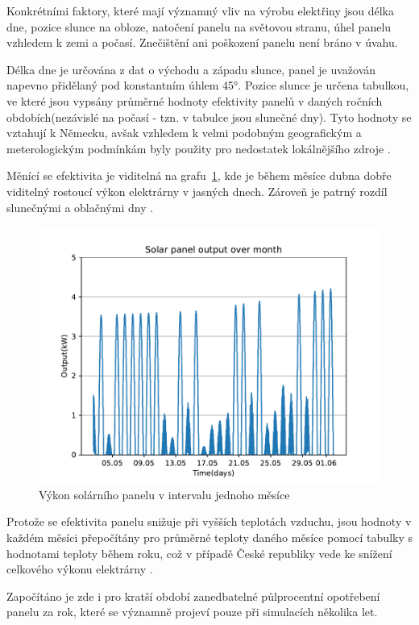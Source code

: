 \documentclass[12pt,a4paper]{Cotmas-2018}
\begin{document}
Konkrétními faktory, které mají významný vliv na výrobu elektřiny jsou délka dne, pozice slunce na obloze, natočení panelu na světovou stranu, úhel panelu vzhledem k zemi a počasí. Znečištění ani poškození panelu není bráno v úvahu.

Délka dne je určována z dat o východu a západu slunce, panel je uvažován napevno přidělaný pod konstantním úhlem 45°.
Pozice slunce je určena tabulkou, ve které jsou vypsány průměrné hodnoty efektivity panelů v daných ročních obdobích(nezávislé na počasí - tzn. v tabulce jsou slunečné dny). Tyto hodnoty se vztahují k Německu, avšak vzhledem k velmi podobným geografickým a meterologickým podmínkám byly použity pro nedostatek lokálnějšího zdroje 
\cite{German-solar-hourly-2014}.

 Měnící se efektivita je viditelná na grafu~\ref{fig:solar_month}, kde je během měsíce dubna dobře viditelný rostoucí výkon elektrárny v jasných dnech. Zároveň je patrný rozdíl slunečnými a oblačnými dny \cite{PF-Bach-2022}.

\begin{figure}[H]
\begin{center}
\includegraphics[width=0.8\linewidth]{img/solar_month.pdf}
\caption{Výkon solárního panelu v intervalu jednoho měsíce}
\end{center}
\label{fig:solar_month}
\end{figure}

Protože se efektivita panelu snižuje při vyšších teplotách vzduchu, jsou hodnoty v každém měsíci přepočítány pro průměrné teploty daného měsíce pomocí tabulky s hodnotami teploty během roku, což v případě České republiky vede ke snížení celkového výkonu elektrárny \cite{Cotmas-2018}.

Započítáno je zde i pro kratší období zanedbatelné půlprocentní opotřebení panelu za rok, které se významně projeví pouze při simulacích několika let.
\end{document}
